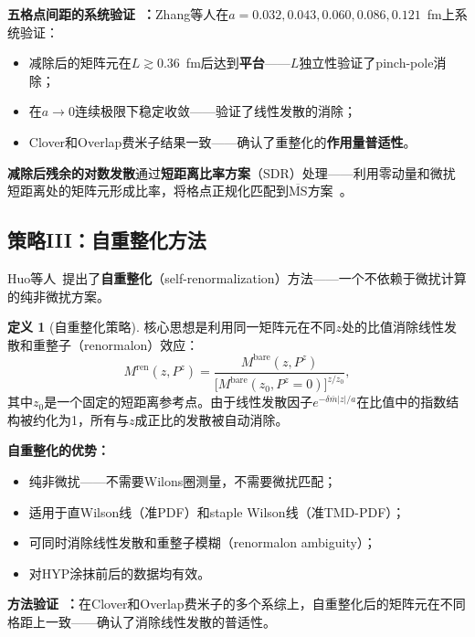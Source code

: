 \documentclass[12pt,a4paper]{ctexart}
\theoremstyle{definition}
\newtheorem{definition}{定义}[section]
\begin{document}
\textbf{五格点间距的系统验证~\cite{Zhang2022renormTMD}：}Zhang等人在$a = 0.032, 0.043, 0.060, 0.086, 0.121$~fm上系统验证：
\begin{itemize}
    \item 减除后的矩阵元在$L \gtrsim 0.36$~fm后达到\textbf{平台}——$L$独立性验证了pinch-pole消除；
    \item 在$a\to 0$连续极限下稳定收敛——验证了线性发散的消除；
    \item Clover和Overlap费米子结果一致——确认了重整化的\textbf{作用量普适性}。
\end{itemize}

\textbf{减除后残余的对数发散}通过\textbf{短距离比率方案}（SDR）处理——利用零动量和微扰短距离处的矩阵元形成比率，将格点正规化匹配到$\overline{\text{MS}}$方案~\cite{Zhang2022renormTMD,He2024unpolTMD}。

\subsection{策略III：自重整化方法}

Huo等人~\cite{Huo2021self}提出了\textbf{自重整化}（self-renormalization）方法——一个不依赖于微扰计算的纯非微扰方案。

\begin{definition}[自重整化策略]
核心思想是利用同一矩阵元在不同$z$处的比值消除线性发散和重整子（renormalon）效应：
\begin{equation}
M^{\text{ren}}(z, P^z) = \frac{M^{\text{bare}}(z, P^z)}{\big[M^{\text{bare}}(z_0, P^z=0)\big]^{z/z_0}},
\label{eq:self_renorm}
\end{equation}
其中$z_0$是一个固定的短距离参考点。由于线性发散因子$e^{-\delta\bar{m}|z|/a}$在比值中的指数结构被约化为1，所有与$z$成正比的发散被自动消除。
\end{definition}

\textbf{自重整化的优势：}
\begin{itemize}
    \item 纯非微扰——不需要Wilons圈测量，不需要微扰匹配；
    \item 适用于直Wilson线（准PDF）和staple Wilson线（准TMD-PDF）；
    \item 可同时消除线性发散和重整子模糊（renormalon ambiguity）；
    \item 对HYP涂抹前后的数据均有效。
\end{itemize}

\textbf{方法验证~\cite{Huo2021self}：}在Clover和Overlap费米子的多个系综上，自重整化后的矩阵元在不同格距上一致——确认了消除线性发散的普适性。
\end{document}
